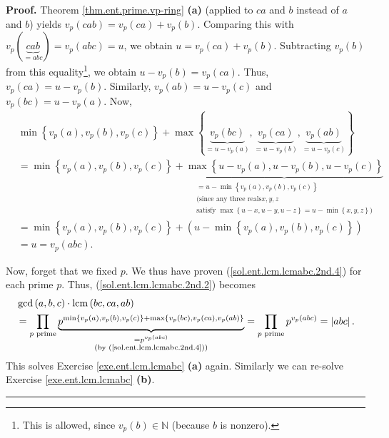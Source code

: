 \documentclass[numbers=enddot,12pt,final,onecolumn,notitlepage]{scrartcl}%
\numberwithin{exer}{subsection}
\theoremstyle{definition}
\newenvironment{fineprint}{\begin{small}}{\end{small}}
\newenvironment{proof}[1][Proof]{\noindent\textbf{#1.} }{\ \rule{0.5em}{0.5em}}
\let\prodnonlimits\prod
\renewcommand{\prod}{\prodnonlimits\limits}
\begin{document}
\begin{fineprint}
\begin{proof}
Theorem \ref{thm.ent.prime.vp-ring} \textbf{(a)} (applied to $ca$ and $b$
instead of $a$ and $b$) yields $v_{p}\left(  cab\right)  =v_{p}\left(
ca\right)  +v_{p}\left(  b\right)  $. Comparing this with $v_{p}\left(
\underbrace{cab}_{=abc}\right)  =v_{p}\left(  abc\right)  =u$, we obtain
$u=v_{p}\left(  ca\right)  +v_{p}\left(  b\right)  $. Subtracting
$v_{p}\left(  b\right)  $ from this equality\footnote{This is allowed, since
$v_{p}\left(  b\right)  \in\mathbb{N}$ (because $b$ is nonzero).}, we obtain
$u-v_{p}\left(  b\right)  =v_{p}\left(  ca\right)  $. Thus, $v_{p}\left(
ca\right)  =u-v_{p}\left(  b\right)  $. Similarly, $v_{p}\left(  ab\right)
=u-v_{p}\left(  c\right)  $ and $v_{p}\left(  bc\right)  =u-v_{p}\left(
a\right)  $. Now,%
\begin{align}
&  \min\left\{  v_{p}\left(  a\right)  ,v_{p}\left(  b\right)  ,v_{p}\left(
c\right)  \right\}  +\max\left\{  \underbrace{v_{p}\left(  bc\right)
}_{=u-v_{p}\left(  a\right)  },\underbrace{v_{p}\left(  ca\right)  }%
_{=u-v_{p}\left(  b\right)  },\underbrace{v_{p}\left(  ab\right)  }%
_{=u-v_{p}\left(  c\right)  }\right\} \nonumber\\
&  =\min\left\{  v_{p}\left(  a\right)  ,v_{p}\left(  b\right)  ,v_{p}\left(
c\right)  \right\}  +\underbrace{\max\left\{  u-v_{p}\left(  a\right)
,u-v_{p}\left(  b\right)  ,u-v_{p}\left(  c\right)  \right\}  }%
_{\substack{=u-\min\left\{  v_{p}\left(  a\right)  ,v_{p}\left(  b\right)
,v_{p}\left(  c\right)  \right\}  \\\text{(since any three reals
}x,y,z\\\text{satisfy }\max\left\{  u-x,u-y,u-z\right\}  =u-\min\left\{
x,y,z\right\}  \text{)}}}\nonumber\\
&  =\min\left\{  v_{p}\left(  a\right)  ,v_{p}\left(  b\right)  ,v_{p}\left(
c\right)  \right\}  +\left(  u-\min\left\{  v_{p}\left(  a\right)
,v_{p}\left(  b\right)  ,v_{p}\left(  c\right)  \right\}  \right) \nonumber\\
&  =u=v_{p}\left(  abc\right)  . \label{sol.ent.lcm.lcmabc.2nd.4}%
\end{align}


Now, forget that we fixed $p$. We thus have proven
(\ref{sol.ent.lcm.lcmabc.2nd.4}) for each prime $p$. Thus,
(\ref{sol.ent.lcm.lcmabc.2nd.2}) becomes%
\begin{align*}
&  \gcd\left(  a,b,c\right)  \cdot\operatorname{lcm}\left(  bc,ca,ab\right) \\
&  =\prod\limits_{p\text{ prime}}\underbrace{p^{\min\left\{  v_{p}\left(
a\right)  ,v_{p}\left(  b\right)  ,v_{p}\left(  c\right)  \right\}
+\max\left\{  v_{p}\left(  bc\right)  ,v_{p}\left(  ca\right)  ,v_{p}\left(
ab\right)  \right\}  }}_{\substack{=p^{v_{p}\left(  abc\right)  }\\\text{(by
(\ref{sol.ent.lcm.lcmabc.2nd.4}))}}}=\prod_{p\text{ prime}}p^{v_{p}\left(
abc\right)  }=\left\vert abc\right\vert .
\end{align*}
This solves Exercise \ref{exe.ent.lcm.lcmabc} \textbf{(a)} again. Similarly we
can re-solve Exercise \ref{exe.ent.lcm.lcmabc} \textbf{(b)}.
\end{proof}


\end{fineprint}
\end{document}

